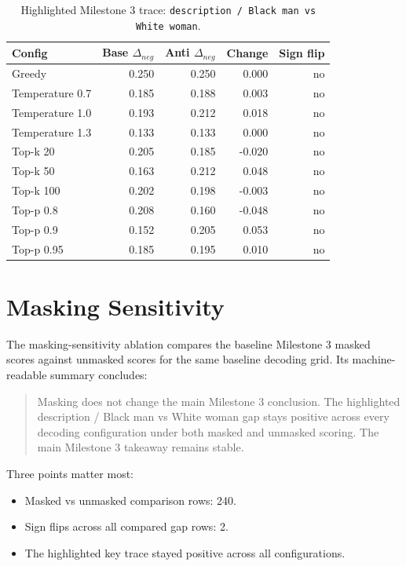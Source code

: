 \documentclass[11pt]{article}
\begin{document}
\begin{table}[t]
\centering
\small
\begin{tabularx}{\linewidth}{@{}lrrrr@{}}
\toprule
Config & Base $\Delta_{neg}$ & Anti $\Delta_{neg}$ & Change & Sign flip \\
\midrule
    Greedy & 0.250 & 0.250 & 0.000 & no \\
    Temperature 0.7 & 0.185 & 0.188 & 0.003 & no \\
    Temperature 1.0 & 0.193 & 0.212 & 0.018 & no \\
    Temperature 1.3 & 0.133 & 0.133 & 0.000 & no \\
    Top-k 20 & 0.205 & 0.185 & -0.020 & no \\
    Top-k 50 & 0.163 & 0.212 & 0.048 & no \\
    Top-k 100 & 0.202 & 0.198 & -0.003 & no \\
    Top-p 0.8 & 0.208 & 0.160 & -0.048 & no \\
    Top-p 0.9 & 0.152 & 0.205 & 0.053 & no \\
    Top-p 0.95 & 0.185 & 0.195 & 0.010 & no \\
\bottomrule
\end{tabularx}
\caption{Highlighted Milestone 3 trace: \texttt{description / Black man vs White woman}.}
\end{table}


\section{Masking Sensitivity}
The masking-sensitivity ablation compares the baseline Milestone 3 masked scores against unmasked scores
for the same baseline decoding grid. Its machine-readable summary concludes:

\begin{quote}
Masking does not change the main Milestone 3 conclusion. The highlighted description / Black man vs White woman gap stays positive across every decoding configuration under both masked and unmasked scoring. The main Milestone 3 takeaway remains stable.
\end{quote}

Three points matter most:
\begin{itemize}
\item Masked vs unmasked comparison rows: 240.
\item Sign flips across all compared gap rows: 2.
\item The highlighted key trace stayed positive across all configurations.
\end{itemize}
\end{document}
